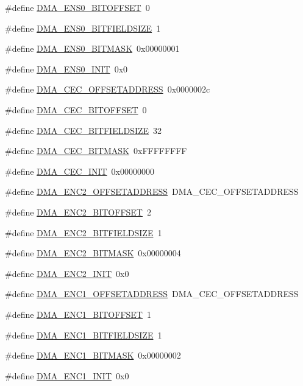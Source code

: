 \begin{DoxyCompactItemize}
\#define \hyperlink{a00547_a8c2ee451a3a83cc383f7b6df839e0e94}{DMA\_\-ENS0\_\-BITOFFSET}~0
\item 
\#define \hyperlink{a00547_ad852bf260d86a03c492dda890f706436}{DMA\_\-ENS0\_\-BITFIELDSIZE}~1
\item 
\#define \hyperlink{a00547_a9c2795aef353c9f52ec90d1902a4b06c}{DMA\_\-ENS0\_\-BITMASK}~0x00000001
\item 
\#define \hyperlink{a00547_a61559eafe4af3c6a976af93c32e548b4}{DMA\_\-ENS0\_\-INIT}~0x0
\item 
\#define \hyperlink{a00547_aa20030582964128876b5c66ee9c73b71}{DMA\_\-CEC\_\-OFFSETADDRESS}~0x0000002c
\item 
\#define \hyperlink{a00547_a80f794076518f1e4fce55dd2600392e8}{DMA\_\-CEC\_\-BITOFFSET}~0
\item 
\#define \hyperlink{a00547_a9562638fe2d229b2a5e35ad6f6a1f059}{DMA\_\-CEC\_\-BITFIELDSIZE}~32
\item 
\#define \hyperlink{a00547_a5e6dc4ed79f7cb0e5d5d23c37e6838d8}{DMA\_\-CEC\_\-BITMASK}~0xFFFFFFFF
\item 
\#define \hyperlink{a00547_a22414a3b0c649c6daa0829a9dd7701ff}{DMA\_\-CEC\_\-INIT}~0x00000000
\item 
\#define \hyperlink{a00547_aff08d49030a7e049806294a7e7b64113}{DMA\_\-ENC2\_\-OFFSETADDRESS}~DMA\_\-CEC\_\-OFFSETADDRESS
\item 
\#define \hyperlink{a00547_a42e056fab0b0a89352bced5ac3d33fdd}{DMA\_\-ENC2\_\-BITOFFSET}~2
\item 
\#define \hyperlink{a00547_aae284ba10854d4b9d0c4b4bc01fc54e2}{DMA\_\-ENC2\_\-BITFIELDSIZE}~1
\item 
\#define \hyperlink{a00547_a80c48492165f72c698d4131cc8dd6bcc}{DMA\_\-ENC2\_\-BITMASK}~0x00000004
\item 
\#define \hyperlink{a00547_a90af2a70e5bbcfb5e4bbc7b25a958f78}{DMA\_\-ENC2\_\-INIT}~0x0
\item 
\#define \hyperlink{a00547_a9e62a6f40a6bd7a4c2d220a3e979bf61}{DMA\_\-ENC1\_\-OFFSETADDRESS}~DMA\_\-CEC\_\-OFFSETADDRESS
\item 
\#define \hyperlink{a00547_a5665d25f0b0a7d87974aa69374eae06c}{DMA\_\-ENC1\_\-BITOFFSET}~1
\item 
\#define \hyperlink{a00547_a028791b275fc7885453223defe8cc621}{DMA\_\-ENC1\_\-BITFIELDSIZE}~1
\item 
\#define \hyperlink{a00547_a03035720981ee88338fb36db0dc5fc4d}{DMA\_\-ENC1\_\-BITMASK}~0x00000002
\item 
\#define \hyperlink{a00547_a77329e16de9737f86123818e56a538f8}{DMA\_\-ENC1\_\-INIT}~0x0

\end{DoxyCompactItemize}

